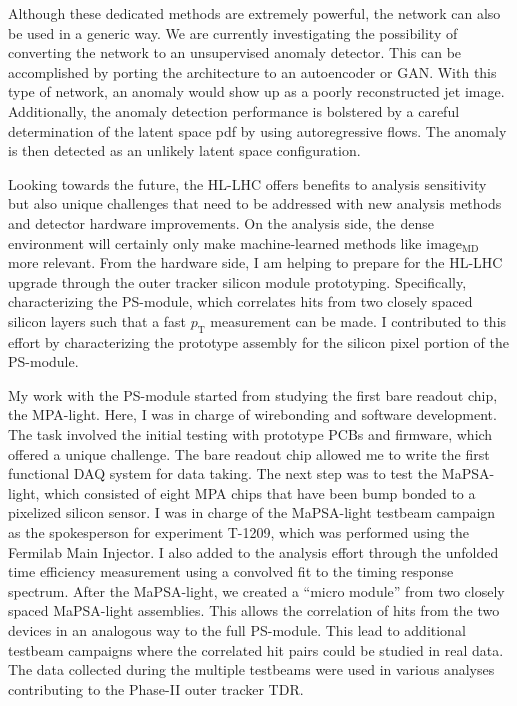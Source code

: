 \documentclass[12pt]{article}
\begin{document}
Although these dedicated methods are
extremely powerful, the network can also be used in a generic way.
We are currently investigating the possibility of converting the network to an unsupervised
anomaly detector.  This can be accomplished by porting the architecture to an autoencoder or GAN.
With this type of network, an anomaly would show up as a poorly reconstructed jet image.
Additionally, the anomaly detection performance is bolstered by a careful determination of the latent space pdf by using autoregressive flows.
The anomaly is then detected as an unlikely latent space configuration.

Looking towards the future, the HL-LHC offers benefits to analysis sensitivity
but also unique challenges that need to be addressed with new analysis methods
and detector hardware improvements.  On the analysis side, the dense environment
will certainly only make machine-learned methods like $\mathrm{image_{MD}}$ more
relevant.  From the hardware side, I am helping to prepare for the HL-LHC
upgrade through the outer tracker silicon module prototyping.
Specifically, characterizing the PS-module, which correlates hits from two closely
spaced silicon layers such that a fast $p_\mathrm{T}$ measurement can be made.  I contributed to
this effort by characterizing the prototype assembly for the silicon pixel portion
of the PS-module.

My work with the PS-module started from studying the first bare readout chip, the MPA-light.
Here, I was in charge of wirebonding and software development.
The task involved the initial testing with prototype PCBs and firmware, which offered a unique challenge.
The bare readout chip allowed me to
write the first functional DAQ system for data taking.
The next step was to test the MaPSA-light, which consisted of eight MPA chips
that have been bump bonded to a pixelized silicon sensor.
I was in charge of the MaPSA-light testbeam campaign as the spokesperson
for experiment T-1209, which was performed using the Fermilab Main Injector.
I also added to
the analysis effort through the unfolded time efficiency measurement using a convolved
fit to the timing response spectrum.
After the MaPSA-light, we created a ``micro module'' from two closely spaced MaPSA-light
assemblies.  This allows the correlation of hits from the two devices in an analogous
way to the full PS-module.  This lead to additional testbeam campaigns where
the correlated hit pairs could be studied in real data.
The data collected during the multiple testbeams were
used in various analyses contributing to the Phase-II outer tracker TDR.
\end{document}
